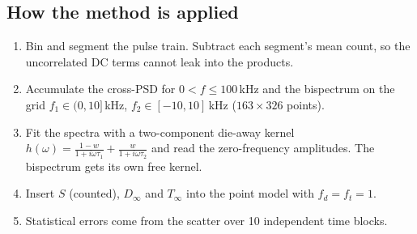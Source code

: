 \documentclass[11pt,a4paper]{article}
\newcommand{\Dinf}{D_\infty}
\newcommand{\Tinf}{T_\infty}
\begin{document}
\subsection{How the method is applied}
\begin{center}
\end{center}
\begin{enumerate}
  \item Bin and segment the pulse train. Subtract each segment's mean count, so the
        uncorrelated DC terms cannot leak into the products.
  \item Accumulate the cross-PSD for $0<f\le100$\,kHz and the bispectrum on the grid
        $f_1\in(0,10]$\,kHz, $f_2\in[-10,10]$\,kHz ($163\times326$ points).
  \item Fit the spectra with a two-component die-away kernel
        $h(\omega)=\frac{1-w}{1+i\omega\tau_1}+\frac{w}{1+i\omega\tau_2}$ and read the
        zero-frequency amplitudes. The bispectrum gets its own free kernel.
  \item Insert $S$ (counted), $\Dinf$ and $\Tinf$ into the point model with $f_d=f_t=1$.
  \item Statistical errors come from the scatter over 10 independent time blocks.
\end{enumerate}
\end{document}
